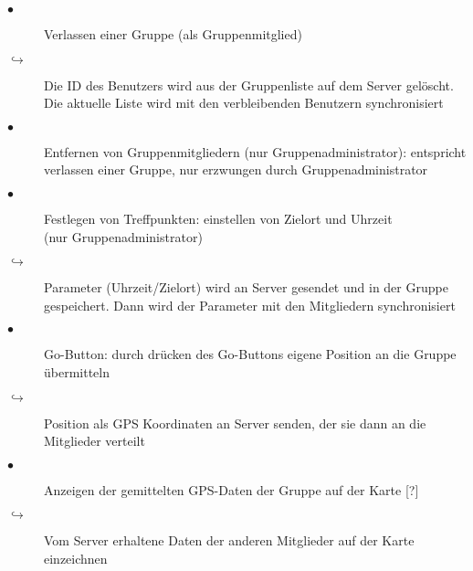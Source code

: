 \documentclass{article}
\begin{document}
\begin{description}
\item[$\bullet$] Verlassen einer Gruppe (als Gruppenmitglied)
\item[$\hookrightarrow$] Die ID des Benutzers wird aus der Gruppenliste auf dem Server gelöscht. Die aktuelle Liste wird mit den verbleibenden Benutzern synchronisiert
\item[$\bullet$] Entfernen von Gruppenmitgliedern (nur Gruppenadministrator): entspricht verlassen einer Gruppe, nur erzwungen durch Gruppenadministrator
\item[$\bullet$] Festlegen von Treffpunkten: einstellen von Zielort und Uhrzeit\\(nur Gruppenadministrator)
\item[$\hookrightarrow$] Parameter (Uhrzeit/Zielort) wird an Server gesendet und in der Gruppe gespeichert. Dann wird der Parameter mit den Mitgliedern synchronisiert
\item[$\bullet$] Go-Button: durch drücken des Go-Buttons eigene Position an die Gruppe übermitteln
\item[$\hookrightarrow$] Position als GPS Koordinaten an Server senden, der sie dann an die Mitglieder verteilt
\item[$\bullet$] Anzeigen der gemittelten GPS-Daten der Gruppe auf der Karte [?]
\item[$\hookrightarrow$] Vom Server erhaltene Daten der anderen Mitglieder auf der Karte einzeichnen
\end{description}
\end{document}
